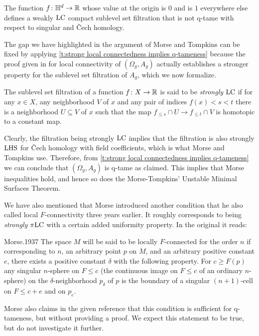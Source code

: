 \begin{cor}
    The function $f \colon \mathbb{H}^d \to \mathbb{R}$ whose value at the origin is $0$ and is $1$ everywhere else defines a weakly $\mathrm{LC}$ compact sublevel set filtration that is not q-tame with respect to singular and \v{C}ech homology.
\end{cor}

The gap we have highlighted in the argument of Morse and Tompkins can be fixed by applying \cref{t:strong local connectedness implies q-tameness} because the proof given in \cite[p.464]{Morse.1939} for local connectivity of $(\Omega_g, A_g)$ actually establishes a stronger property for the sublevel set filtration of $A_g$, which we now formalize.

\begin{defi}
	The sublevel set filtration of a function $f \colon X \to \mathbb{R}$ is said to be \emph{strongly} $\mathrm{LC}$ if for any $x \in X$, any neighborhood $V$ of $x$ and any pair of indices $f(x) < s < t$ there is a neighborhood $U \subseteq V$ of $x$ such that the map $f_{\leq s} \cap U \to f_{\leq t} \cap V$ is homotopic to a constant map.
\end{defi}

Clearly, the filtration being strongly $\mathrm{LC}$ implies that the filtration is also strongly $\mathrm{LHS}$ for \v{C}ech homology with field coefficients, which is what Morse and Tompkins use.
Therefore, from \cref{t:strong local connectedness implies q-tameness} we can conclude that $(\Omega_g, A_g)$ is \mbox{q-tame} as claimed.
This implies that Morse inequalities hold, and hence so does the Morse-Tompkins' Unstable Minimal Surfaces Theorem.

We have also mentioned that Morse introduced another condition that he also called local $F$-connectivity three years earlier.
It roughly corresponds to being \emph{strongly} $\pi\mathrm{LC}$ with a certain added uniformity property.
In the original it reads:
\begin{displaycquote}[p.421-422]{Morse.1937}
	The space $M$ will be said to be locally $F$-connected for the order $n$ if corresponding to $n$, an arbitrary point $p$ on $M$, and an arbitrary positive constant $e$, there exists a positive constant $\delta$ with the following property.
For $c \geq F(p)$ any singular $n$-sphere on $F \leq c$ (the continuous image on $F \leq c$ of an ordinary $n$-sphere) on the $\delta$-neighborhood $p_{\delta}$ of $p$ is the boundary of a singular $(n + 1)$-cell on $F \leq c + e$ and on $p_e$.
\end{displaycquote}
Morse also claims in the given reference that this condition is sufficient for q-tameness, but without providing a proof.
We expect this statement to be true, but do not investigate it further.